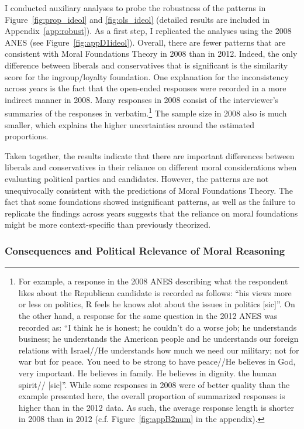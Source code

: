 \documentclass[12pt]{article}
\begin{document}
I conducted auxiliary analyses to probe the robustness of the patterns in Figure~\ref{fig:prop_ideol} and \ref{fig:ols_ideol} (detailed results are included in Appendix~\ref{app:robust}). As a first step, I replicated the analyses using the 2008 ANES (see Figure~\ref{fig:appD1ideol}). Overall, there are fewer patterns that are consistent with Moral Foundations Theory in 2008 than in 2012. Indeed, the only difference between liberals and conservatives that is significant is the similarity score for the ingroup/loyalty foundation. One explanation for the inconsistency across years is the fact that the open-ended responses were recorded in a more indirect manner in 2008. Many responses in 2008 consist of the interviewer's summaries of the responses in verbatim.\footnote{For example, a response in the 2008 ANES describing what the respondent likes about the Republican candidate is recorded as follows: ``his views more or less on politics, R feels he knows alot about the issues in politics
[sic]''. On the other hand, a response for the same question in the 2012 ANES was recorded as: ``I think he is honest; he couldn't do a worse job; he understands business; he understands the American people and he understands our foreign relations with Israel//He understands how much we need our military; not for war but for peace. You need to be strong to have peace//He believes in God, very important. He believes in family. He believes in dignity. the human spirit// [sic]''. While some responses in 2008 were of better quality than the example presented here, the overall proportion of summarized responses is higher than in the 2012 data. As such, the average response length is shorter in 2008 than in 2012 (c.f. Figure~\ref{fig:appB2num} in the appendix).} The sample size in 2008 also is much smaller, which explains the higher uncertainties around the estimated proportions.

Taken together, the results indicate that there are important differences between liberals and conservatives in their reliance on different moral considerations when evaluating political parties and candidates. However, the patterns are not unequivocally consistent with the predictions of Moral Foundations Theory. The fact that some foundations showed insignificant patterns, as well as the failure to replicate the findings across years suggests that the reliance on moral foundations might be more context-specific than previously theorized.


\subsubsection{Consequences and Political Relevance of Moral Reasoning}
\end{document}
